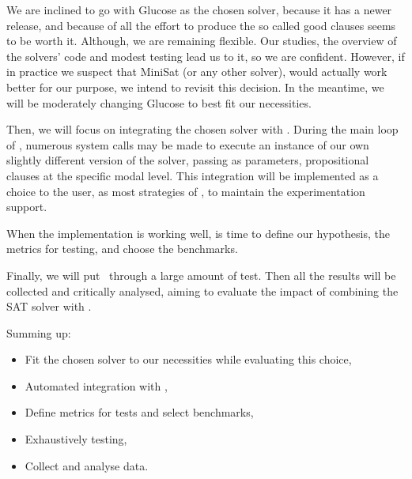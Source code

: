 We are inclined to go with Glucose as the chosen solver, because it has a newer
release, and because of all the effort to produce the so called good clauses
seems to be worth it. Although, we are remaining flexible. Our studies, the
overview of the solvers' code and modest testing lead us to it, so we are
confident. However, if in practice we suspect that MiniSat (or any other
solver), would actually work better for our purpose, we intend to revisit this
decision. In the meantime, we will be moderately changing Glucose to best fit
our necessities.

Then, we will focus on integrating the chosen solver with \ksp. During the main
loop of \ksp, numerous system calls may be made to execute an instance of our
own slightly different version of the solver, passing as parameters,
propositional clauses at the specific modal level. This integration will be
implemented as a choice to the user, as most strategies of \ksp, to maintain the
experimentation support.

When the implementation is working well, is time to define our hypothesis, the
metrics for testing, and choose the benchmarks.

Finally, we will put \ksp~through a large amount of test. Then all the results
will be collected and critically analysed, aiming to evaluate the impact of
combining the SAT solver with \ksp.

Summing up:
\begin{itemize}
    \item Fit the chosen solver to our necessities while evaluating this choice,
    \item Automated integration with \ksp,
    \item Define metrics for tests and select benchmarks,
    \item Exhaustively testing,
    \item Collect and analyse data.
\end{itemize}

